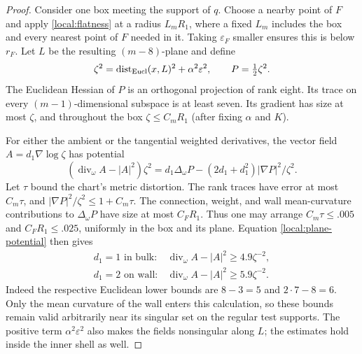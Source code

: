 \documentclass[11pt]{article}
\numberwithin{equation}{section}
\theoremstyle{definition}
\theoremstyle{remark}
\begin{document}
\begin{proof}
Consider one box meeting the support of $q$.  Choose a nearby point
of $F$ and apply \eqref{local:flatness} at a radius $L_mR_1$,
where a fixed $L_m$ includes the box and every nearest point of
$F$ needed in it.  Taking $\varepsilon_F$ smaller ensures this is
below $r_F$.  Let $L$ be the resulting $(m-8)$-plane and define
\[
 \zeta^2=\operatorname{dist}_{\rm Eucl}(x,L)^2+\alpha^2\varepsilon^2,
 \qquad P=\tfrac12\zeta^2.
\]
The Euclidean Hessian of $P$ is an orthogonal projection of rank
eight.  Its trace on every $(m-1)$-dimensional subspace is at least
seven.  Its gradient has size at most $\zeta$, and throughout the
box $\zeta\le C_mR_1$ (after fixing $\alpha$ and $K$).

For either the ambient or the tangential weighted derivatives,
the vector field $A=d_1\nabla\log\zeta$ has potential
\begin{equation}\label{local:plane-potential}
 (\operatorname{div}_\omega A-|A|^2)\zeta^2
 =d_1\Delta_\omega P
       -(2d_1+d_1^2)|\nabla P|^2/\zeta^2.
\end{equation}
Let $\tau$ bound the chart's metric distortion.  The rank traces
have error at most $C_m\tau$, and
$|\nabla P|^2/\zeta^2\le1+C_m\tau$.  The connection, weight, and
wall mean-curvature contributions to $\Delta_\omega P$ have size
at most $C_FR_1$.  Thus one may arrange
$C_m\tau\le .005$ and $C_FR_1\le .025$, uniformly in the box and
its plane.  Equation \eqref{local:plane-potential} then gives
\[
 \begin{array}{ll}
 d_1=1\text{ in bulk}:&
       \operatorname{div}_\omega A-|A|^2\ge4.9\zeta^{-2},\\
 d_1=2\text{ on wall}:&
       \operatorname{div}_\omega A-|A|^2\ge5.9\zeta^{-2}.
 \end{array}
\]
Indeed the respective Euclidean lower bounds are $8-3=5$ and
$2\cdot7-8=6$.  Only the mean curvature of the wall enters this
calculation, so these bounds remain valid arbitrarily near its
singular set on the regular test supports.  The positive term
$\alpha^2\varepsilon^2$ also makes the fields nonsingular along
$L$; the estimates hold inside the inner shell as well.


\end{proof}
\end{document}
